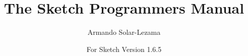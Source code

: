 \documentclass{article}
\newcommand{\version}{1.6.5}
\begin{document}

\title{The Sketch Programmers Manual}
\author{Armando Solar-Lezama}
\date{For Sketch Version \version{}}
\maketitle

\tableofcontents






\let\glossarysection=\section
\renewcommand{\glossarypreamble}{\label{glossary}This is a glossary of flags}
\printglossary[title=Glossary of Flags]
\end{document}
